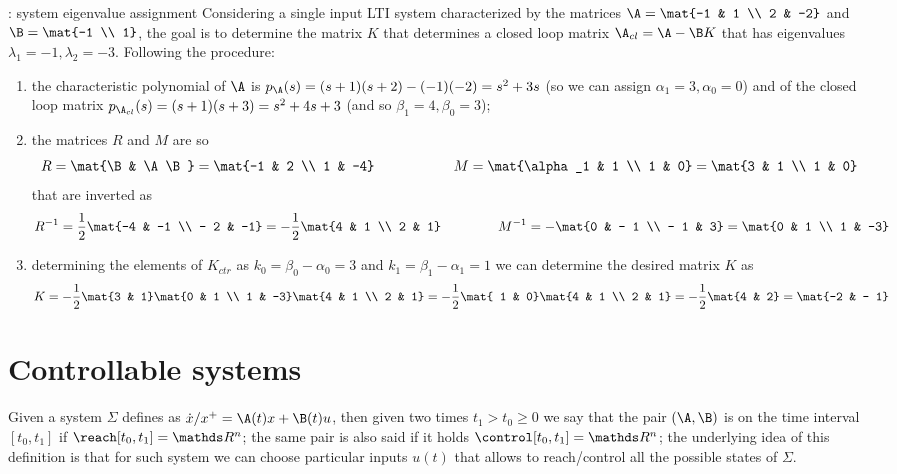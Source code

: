 		\begin{example}{: system eigenvalue assignment}
			Considering a single input LTI system characterized by the matrices $\A = \mat{-1 & 1 \\ 2 & -2}$ and $\B= \mat{-1 \\ 1}$, the goal is to determine the matrix $K$ that determines a closed loop matrix $\A_{cl} = \A- \B K$ that has eigenvalues $\lambda_1 = -1,\lambda_2 = -3$. Following the procedure:
			\begin{enumerate}
				\item the characteristic polynomial of $\A$ is $p_\A(s) = (s+1)(s+2) - (-1)(-2) = s^2 + 3s $ (so we can assign $\alpha_1 = 3, \alpha_0 =0$) and of the closed loop matrix $p_{\A_{cl}}(s) = (s+1)(s+3) = s^2 + 4s + 3 $ (and so $\beta_1 = 4,\beta_0 = 3$);
				
				\item the matrices $R$ and $M$ are so
				\[ R = \mat{\B & \A \B} = \mat{-1 & 2 \\ 1 & -4} \hspace{2cm} M = \mat{\alpha_1 & 1 \\ 1 & 0} = \mat{3 & 1 \\ 1 & 0} \]
				that are inverted as
				\[ R^{-1} = \frac 1 2 \mat{-4 & -1 \\ - 2 & -1} = - \frac 1 2 \mat{4 & 1 \\ 2 & 1} \hspace{1.5cm} M^{-1} = - \mat{0 & - 1 \\ - 1 & 3} = \mat{0 & 1 \\ 1 & -3} \]
				
				\item determining the elements of $K_{ctr}$ as $k_0 = \beta_0 -\alpha_0 = 3$ and $k_1 = \beta_1 - \alpha_1 = 1$ we can determine the desired matrix $K$ as
				\[ K = - \frac 1 2 \mat{3 & 1} \mat{0 & 1 \\ 1 & -3} \mat{4 & 1 \\ 2 & 1} = - \frac 1 2 \mat{ 1 & 0} \mat{4 & 1 \\ 2 & 1} = - \frac 1 2 \mat{4 & 2} = \mat{-2 & - 1} \]
			\end{enumerate} 
		\end{example}

\section{Controllable systems}
	Given a system $\Sigma$ defines as $\dot x/x^+ = \A(t) x + \B(t) u$, then given two times $t_1 > t_0 \geq 0$ we say that the pair $(\A,\B)$ is  on the time interval $[t_0,t_1]$ if $\reach[t_0,t_1] = \mathds R^n$; the same pair is also said  if it holds $\control[t_0,t_1] = \mathds R^n$; the underlying idea of this definition is that for such system we can choose particular inputs $u(t)$ that allows to reach/control all the possible states of $\Sigma$.
	
